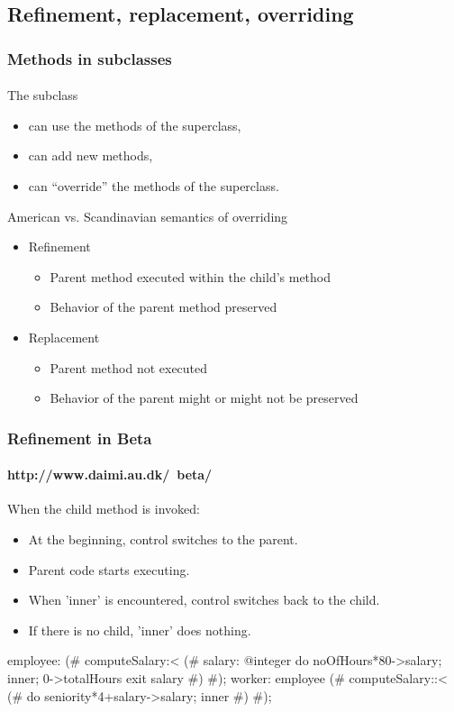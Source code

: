 \documentclass{beamer}
\begin{document}
\subsection{Refinement, replacement, overriding}
\begin{frame}[fragile]
\frametitle{Methods in subclasses}
\framesubtitle{}
The subclass
\begin{itemize}
\item can use  the methods of the superclass,
\item can add new methods,
\item can ``override'' the methods of the superclass.
\end{itemize}
\bigskip

American vs. Scandinavian semantics of overriding
\begin{itemize}
\item Refinement
\begin{itemize}
\item Parent method executed within the child's method
\item Behavior of the parent method preserved
\end{itemize}
\item Replacement
\begin{itemize}
\item Parent method not executed 
\item Behavior of the parent might or might not be preserved 
\end{itemize}
\end{itemize}
\end{frame}





\begin{frame}[fragile]
\frametitle{Refinement in Beta}
\framesubtitle{http://www.daimi.au.dk/~beta/}
When the child method is invoked:
\begin{itemize}
\item At the beginning, control switches to the parent.
\item Parent code starts executing.
\item When 'inner' is encountered, control switches
back to the child. 
\item If there is no child, 'inner' does nothing. 
\end{itemize}
\begin{java}
employee:
(# computeSalary:< 
     (# salary: @integer 
     do noOfHours*80->salary; inner; 0->totalHours  
     exit salary
     #)
#);
worker: employee
    (# computeSalary::< 
       (# do seniority*4+salary->salary; inner #)
 #);

\end{java}

\end{frame}
\end{document}
